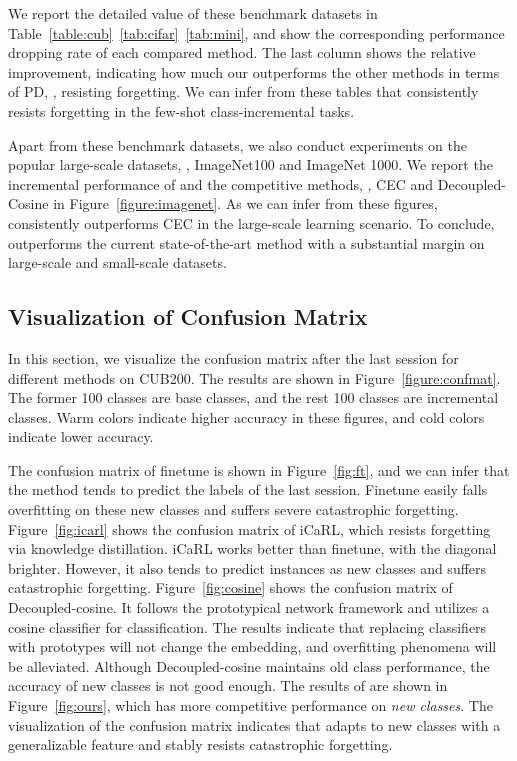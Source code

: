 We report the detailed value of these benchmark datasets in Table~\ref{table:cub}~\ref{tab:cifar}~\ref{tab:mini}, and show the corresponding performance dropping rate of each compared method. The last column shows the relative improvement, indicating how much our \name outperforms the other methods in terms of PD, \ie, resisting forgetting. 
We can infer from these tables that \name  consistently resists forgetting in the few-shot class-incremental tasks.

Apart from these benchmark datasets, we also conduct experiments on the popular large-scale datasets, \ie, ImageNet100 and ImageNet 1000. We report the incremental performance of \name and the competitive methods, \ie, CEC and Decoupled-Cosine in Figure~\ref{figure:imagenet}. As we can infer from these figures, \name consistently outperforms CEC in the large-scale learning scenario. To conclude, \name outperforms the current state-of-the-art method with a substantial margin on large-scale and small-scale datasets.







\subsection{Visualization of Confusion Matrix}

In this section, we visualize the confusion matrix after the last session for different methods on CUB200. The results are shown in Figure~\ref{figure:confmat}. The former 100 classes are base classes, and the rest 100 classes are incremental classes. 
Warm colors indicate higher accuracy in these figures, and cold colors indicate lower accuracy.

The confusion matrix of finetune is shown in Figure~\ref{fig:ft}, and we can infer that the method tends to predict the labels of the last session. Finetune easily falls overfitting on these new classes and suffers severe catastrophic forgetting. Figure~\ref{fig:icarl} shows the confusion matrix of iCaRL, which resists forgetting via knowledge distillation. iCaRL works better than finetune, with the diagonal brighter. However, it also tends to predict instances as new classes and suffers catastrophic forgetting. Figure~\ref{fig:cosine} shows the confusion matrix of Decoupled-cosine. It follows the prototypical network framework and utilizes a cosine classifier for classification. The results indicate that replacing classifiers with prototypes will not change the embedding, and overfitting phenomena will be alleviated. 
Although Decoupled-cosine maintains old class performance, the accuracy of new classes is not good enough. The results of \name are shown in Figure~\ref{fig:ours}, which has more competitive performance on \emph{new classes}.  The visualization of the confusion matrix indicates that \name adapts to new classes with a generalizable feature and stably resists catastrophic forgetting.

